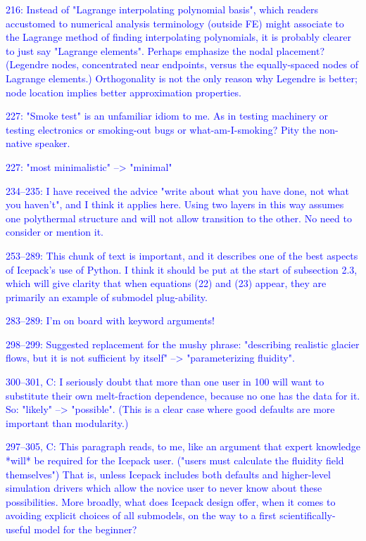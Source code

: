 \documentclass{article}
\theoremstyle{definition}
\theoremstyle{plain}
\begin{document}
\textcolor{blue}{216:  Instead of "Lagrange interpolating polynomial basis", which readers accustomed to numerical analysis terminology (outside FE) might associate to the Lagrange method of finding interpolating polynomials, it is probably clearer to just say "Lagrange elements".  Perhaps emphasize the nodal placement?  (Legendre nodes, concentrated near endpoints, versus the equally-spaced nodes of Lagrange elements.)  Orthogonality is not the only reason why Legendre is better; node location implies better approximation properties.}

\textcolor{blue}{227:  "Smoke test" is an unfamiliar idiom to me.  As in testing machinery or testing electronics or smoking-out bugs or what-am-I-smoking?  Pity the non-native speaker.}

\textcolor{blue}{227:  "most minimalistic" --> "minimal"}

\textcolor{blue}{234--235:  I have received the advice "write about what you have done, not what you haven't", and I think it applies here.  Using two layers in this way assumes one polythermal structure and will not allow transition to the other.  No need to consider or mention it.}

\textcolor{blue}{253--289:  This chunk of text is important, and it describes one of the best aspects of Icepack's use of Python.  I think it should be put at the start of subsection 2.3, which will give clarity that when equations (22) and (23) appear, they are primarily an example of submodel plug-ability.}

\textcolor{blue}{283--289:  I'm on board with keyword arguments!}

\textcolor{blue}{298--299:  Suggested replacement for the mushy phrase: "describing realistic glacier flows, but it is not sufficient by itself" --> "parameterizing fluidity".}

\textcolor{blue}{300--301, C:  I seriously doubt that more than one user in 100 will want to substitute their own melt-fraction dependence, because no one has the data for it.  So: "likely" --> "possible".  (This is a clear case where good defaults are more important than modularity.)}

\textcolor{blue}{297--305, C:  This paragraph reads, to me, like an argument that expert knowledge *will* be required for the Icepack user.  ("users must calculate the fluidity field themselves")  That is, unless Icepack includes both defaults and higher-level simulation drivers which allow the novice user to never know about these possibilities.  More broadly, what does Icepack design offer, when it comes to avoiding explicit choices of all submodels, on the way to a first scientifically-useful model for the beginner?}
\end{document}
